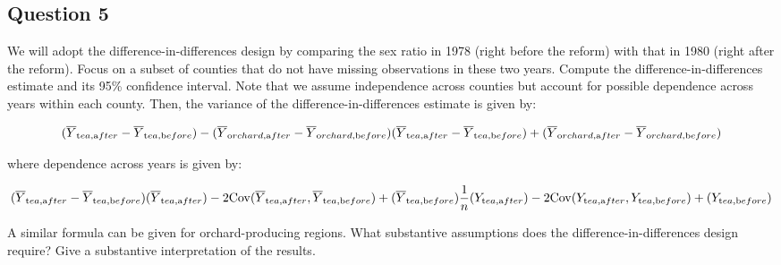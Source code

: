 \documentclass[]{article}
\begin{document}
\subsection{Question 5}\label{question-5}

We will adopt the difference-in-differences design by comparing the sex
ratio in 1978 (right before the reform) with that in 1980 (right after
the reform). Focus on a subset of counties that do not have missing
observations in these two years. Compute the difference-in-differences
estimate and its 95\% confidence interval. Note that we assume
independence across counties but account for possible dependence across
years within each county. Then, the variance of the
difference-in-differences estimate is given by:

\[
    (\overline{Y}_{{\text tea}, {\text after}} -  \overline{Y}_{{\text tea},
    {\text before}}) - (\overline{Y}_{{\text orchard}, {\text after}} -  \overline{Y}_{{\text orchard},
    {\text before}}) \\
    (\overline{Y}_{{\text tea}, {\text after}} -  \overline{Y}_{{\text tea},
    {\text before}}) + (\overline{Y}_{{\text orchard}, {\text after}} -  \overline{Y}_{{\text orchard},
    {\text before}}) 
  \]

where dependence across years is given by:

\[
    (\overline{Y}_{{\text tea}, {\text after}} -  \overline{Y}_{{\text tea},
    {\text before}}) \\
    (\overline{Y}_{{\text tea}, {\text after}}) - 2 {\rm
          Cov}(\overline{Y}_{{\text tea}, {\text after}}, \overline{Y}_{{\text tea},
          {\text before}}) + (\overline{Y}_{{\text tea}, {\text before}}) \\
    \frac{1}{n} (Y_{{\text tea}, {\text after}}) - 2 {\rm
          Cov}(Y_{{\text tea}, {\text after}}, Y_{{\text tea},
          {\text before}}) + (Y_{{\text tea}, {\text before}})
  \]

A similar formula can be given for orchard-producing regions. What
substantive assumptions does the difference-in-differences design
require? Give a substantive interpretation of the results.
\end{document}
